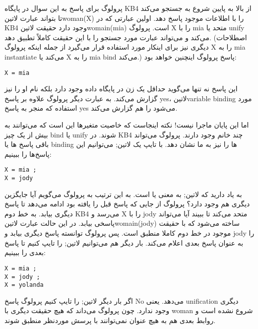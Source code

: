 پرولوگ برای پاسخ به این سوال در پایگاه KB4 از بالا به پایین شروع به جستجو می‌کند تا بتواند عبارت ‌لاتین{woman(X)} را با اطلاعات موجود ‌پاسخ دهد. اولین عبارتی که در KB4 وجود دارد حقیقت ‌لاتین{womain(mia)} است. پرولوگ X را با mia متحد یا unify می‌کند و می‌تواند عبارت مورد جستجو را با این حقیقت کاملاً  تطبیق دهد. (اصطلاحات دیگری نیز برای اینکار مورد استفاده قرار می‌گیرد از جمله اینکه پرولوگ X را به mia instantiate می‌کند یا X را به mia bind می‌کند.) پاسخ پرولوگ اینچنین خواهد بود:

\begin{latin}
\begin{lstlisting}
X = mia
\end{lstlisting}
\end{latin}

این پاسخ نه تنها می‌گوید حداقل یک زن در پایگاه داده وجود دارد بلکه نام او را نیز گزارش می‌کند. به عبارت دیگر پرولوگ علاوه بر پاسخ yes، ‌لاتین{variable binding} مورد استفاده که منجر به پاسخ yes می‌شود را هم گزارش می‌کند.

اما این پایان ماجرا نیست! نکته اینجاست که خاصیت متغیرها این است که می‌توانند به بیش از یک چیز bind یا unify شوند. در KB4 چند خانم وجود دارند. پرولوگ می‌تواند باقی پاسخ ها یا binding ها را نیز به ما نشان دهد. با تایپ یک ‌لاتین{;} می‌توانیم این پاسخ‌ها را ببینیم:

\begin{latin}
\begin{lstlisting}
X = mia ;
X = jody
\end{lstlisting}
\end{latin}

به یاد دارید که ‌لاتین{;} به معنی یا است. به این ترتیب به پرولوگ می‌گویم آیا جایگزین دیگری هم وجود دارد؟ پرولوگ از جایی که پاسخ قبل را یافته بود ادامه می‌دهد تا پاسخ دیگری بیابد. به خط دوم KB4 می‌رسد و X را با jody متحد می‌کند تا ببیند آیا می‌تواند پاسخی بیابد. در این حالت عبارت ‌لاتین{womain(jody)} ساخته می‌شود که با حقیقت موجود در خط دوم کاملا منطبق است. پس پرولوگ توانسته پاسخ دیگری بیابد و jody را به عنوان پاسخ بعدی اعلام می‌کند. بار دیگر هم می‌توانیم ‌لاتین{;} را تایپ کنیم تا پاسخ بعدی را ببینیم:

\begin{latin}
\begin{lstlisting}
X = mia ;
X = jody ;
X = yolanda
\end{lstlisting}
\end{latin}

اگر بار دیگر ‌لاتین{;} را تایپ کنیم پرولوگ پاسخ No می‌دهد. یعنی unification دیگری وجود ندارد. چون پرولوگ می‌داند که هیچ حقیقت دیگری با woman شروع نشده است و روابط بعدی هم به هیچ عنوان نمی‌توانند با پرسش موردنظر منطبق شوند.

